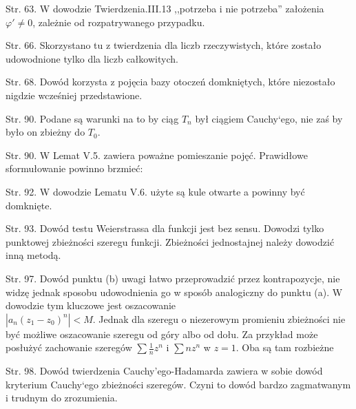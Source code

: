 \start Str. 63. W dowodzie Twierdzenia.III.13 ,,potrzeba i nie
potrzeba'' założenia $\varphi' \neq 0$, zależnie od rozpatrywanego
przypadku.

\start Str. 66. Skorzystano tu z twierdzenia dla liczb rzeczywistych,
które zostało udowodnione tylko dla liczb całkowitych.

\start Str. 68. Dowód korzysta z pojęcia bazy otoczeń domkniętych,
które niezostało nigdzie wcześniej przedstawione.

\start Str. 90. Podane są warunki na to by ciąg $T_{ n }$ był ciągiem
Cauchy`ego, nie zaś by było on zbieżny do $T_{ 0 }$.

\start Str. 90. W Lemat V.5. zawiera poważne pomieszanie pojęć.
Prawidłowe sformułowanie powinno brzmieć:

\start Str. 92. W dowodzie Lematu V.6. użyte są kule otwarte a powinny
być domknięte.

\start Str. 93. Dowód testu Weierstrassa dla funkcji jest bez sensu.
Dowodzi tylko punktowej zbieżności szeregu funkcji. Zbieżności
jednostajnej należy dowodzić inną metodą.

\start Str. 97. Dowód punktu (b) uwagi łatwo przeprowadzić przez
kontrapozycje, nie widzę jednak sposobu udowodnienia go w sposób
analogiczny do punktu (a). W dowodzie tym kluczowe jest oszacowanie
\\
$| a_{n} (z_{1} - z_{ 0 })^{n}|<M$. Jednak dla szeregu o niezerowym
promieniu zbieżności nie być możliwe oszacowanie szeregu od góry albo
od dołu. Za przykład może posłużyć zachowanie szeregów
$\sum \frac{1}{n} z^{n}$ i $\sum n z^{n}$ w $z=1$. Oba są tam
rozbieżne

\start Str. 98. Dowód twierdzenia Cauchy'ego-Hadamarda zawiera w sobie
dowód kryterium Cauchy`ego zbieżności szeregów. Czyni to dowód bardzo
zagmatwanym i trudnym do zrozumienia.




